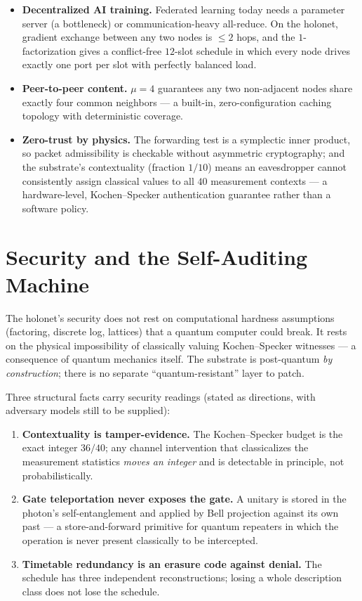 \documentclass[11pt]{article}
\begin{document}
\begin{itemize}[leftmargin=1.4em]
\item \textbf{Decentralized AI training.} Federated learning today needs a parameter server (a
bottleneck) or communication-heavy all-reduce. On the holonet, gradient exchange between any two nodes
is $\le 2$ hops, and the $1$-factorization gives a conflict-free $12$-slot schedule in which every node
drives exactly one port per slot with perfectly balanced load.
\item \textbf{Peer-to-peer content.} $\mu=4$ guarantees any two non-adjacent nodes share exactly four
common neighbors --- a built-in, zero-configuration caching topology with deterministic coverage.
\item \textbf{Zero-trust by physics.} The forwarding test is a symplectic inner product, so packet
admissibility is checkable without asymmetric cryptography; and the substrate's contextuality (fraction
$1/10$) means an eavesdropper cannot consistently assign classical values to all $40$ measurement
contexts --- a hardware-level, Kochen--Specker authentication guarantee rather than a software policy.
\end{itemize}

\section{Security and the Self-Auditing Machine}
\label{sec:security}
The holonet's security does not rest on computational hardness assumptions (factoring, discrete log,
lattices) that a quantum computer could break. It rests on the physical impossibility of classically
valuing Kochen--Specker witnesses --- a consequence of quantum mechanics itself. The substrate is
post-quantum \emph{by construction}; there is no separate ``quantum-resistant'' layer to patch.

Three structural facts carry security readings (stated as directions, with adversary models still to
be supplied):
\begin{enumerate}[leftmargin=1.4em]
\item \textbf{Contextuality is tamper-evidence.} The Kochen--Specker budget is the exact integer
$36/40$; any channel intervention that classicalizes the measurement statistics \emph{moves an
integer} and is detectable in principle, not probabilistically.
\item \textbf{Gate teleportation never exposes the gate.} A unitary is stored in the photon's
self-entanglement and applied by Bell projection against its own past --- a store-and-forward primitive
for quantum repeaters in which the operation is never present classically to be intercepted.
\item \textbf{Timetable redundancy is an erasure code against denial.} The schedule has three
independent reconstructions; losing a whole description class does not lose the schedule.
\end{enumerate}
\end{document}
